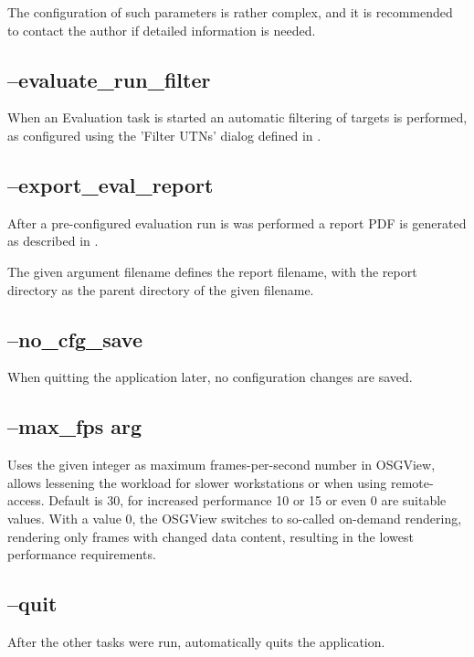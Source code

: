 The configuration of such parameters is rather complex, and it is recommended to contact the author if detailed information is needed.

\subsection{--evaluate\_run\_filter}

When an Evaluation task is started an automatic filtering of targets is performed, as configured using the 'Filter UTNs' dialog defined in .


\subsection{--export\_eval\_report}

After a pre-configured evaluation run is was performed a report PDF is generated as described in .

The given argument filename defines the report filename, with the report directory as the parent directory of the given filename.

\subsection{--no\_cfg\_save}

When quitting the application later, no configuration changes are saved.

\subsection{--max\_fps arg}

Uses the given integer as maximum frames-per-second number in OSGView, allows lessening the workload for slower workstations or when using remote-access. Default is 30, for increased performance 10 or 15 or even 0 are suitable values. With a value 0, the OSGView switches to so-called on-demand rendering, rendering only frames with changed data content, resulting in the lowest performance requirements.

\subsection{--quit}

After the other tasks were run, automatically quits the application.


